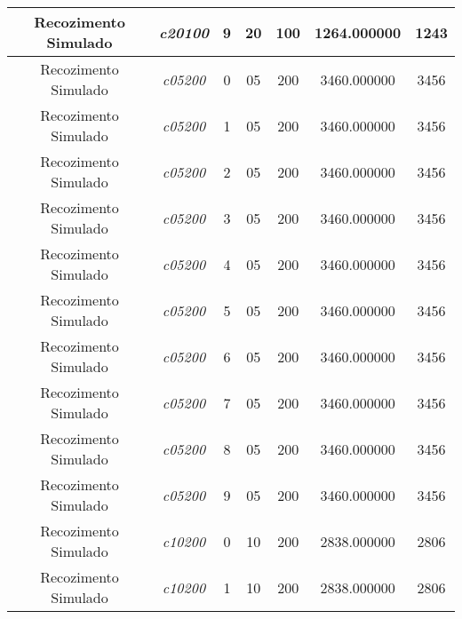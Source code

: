 {\begin{longtable}{cc|c|cc|cc}
			Recozimento Simulado & \textit{c20100}    & 9                               & 20               & 100              & 1264.000000                          & 1243 \\ \hline
			Recozimento Simulado & \textit{c05200}    & 0                               & 05               & 200              & 3460.000000                          & 3456 \\ 
			Recozimento Simulado & \textit{c05200}    & 1                               & 05               & 200              & 3460.000000                          & 3456 \\ 
			Recozimento Simulado & \textit{c05200}    & 2                               & 05               & 200              & 3460.000000                          & 3456 \\ 
			Recozimento Simulado & \textit{c05200}    & 3                               & 05               & 200              & 3460.000000                          & 3456 \\ 
			Recozimento Simulado & \textit{c05200}    & 4                               & 05               & 200              & 3460.000000                          & 3456 \\ 
			Recozimento Simulado & \textit{c05200}    & 5                               & 05               & 200              & 3460.000000                          & 3456 \\ 
			Recozimento Simulado & \textit{c05200}    & 6                               & 05               & 200              & 3460.000000                          & 3456 \\ 
			Recozimento Simulado & \textit{c05200}    & 7                               & 05               & 200              & 3460.000000                          & 3456 \\ 
			Recozimento Simulado & \textit{c05200}    & 8                               & 05               & 200              & 3460.000000                          & 3456 \\ 
			Recozimento Simulado & \textit{c05200}    & 9                               & 05               & 200              & 3460.000000                          & 3456 \\ \hline
			Recozimento Simulado & \textit{c10200}    & 0                               & 10               & 200              & 2838.000000                          & 2806 \\ 
			Recozimento Simulado & \textit{c10200}    & 1                               & 10               & 200              & 2838.000000                          & 2806 \\ 

\end{longtable}}
